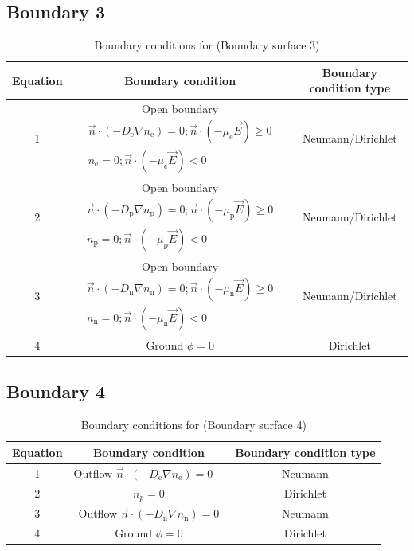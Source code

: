 \documentclass[12pt, a4paper]{report}
\begin{document}
\subsection{Boundary 3}

\begin{table}[!h]
    \centering\begin{tabular}{c|c|c}
        Equation & Boundary condition & Boundary condition type\\ \hline
        1 & Open boundary $\begin{array}{c}\vec{n} \cdot\left(-D_{\mathrm{e}} \nabla n_{\mathrm{e}}\right)=0 ; \vec{n} \cdot\left(-\mu_{\mathrm{e}} \vec{E}\right) \geqslant 0 \\ n_{\mathrm{e}}=0 ; \vec{n} \cdot\left(-\mu_{\mathrm{e}} \vec{E}\right)<0\end{array} $ & Neumann/Dirichlet \\ \hline
        2 & Open boundary $\begin{array}{c}\vec{n} \cdot\left(-D_{\mathrm{p}} \nabla n_{\mathrm{p}}\right)=0 ; \vec{n} \cdot\left(-\mu_{\mathrm{p}} \vec{E}\right) \geqslant 0 \\ n_{\mathrm{p}}=0 ; \vec{n} \cdot\left(-\mu_{\mathrm{p}} \vec{E}\right)<0\end{array} $   & Neumann/Dirichlet \\ \hline
        3 & Open boundary $\begin{array}{c}\vec{n} \cdot\left(-D_{\mathrm{n}} \nabla n_{\mathrm{n}}\right)=0 ; \vec{n} \cdot\left(-\mu_{\mathrm{n}} \vec{E}\right) \geqslant 0 \\ n_{\mathrm{n}}=0 ; \vec{n} \cdot\left(-\mu_{\mathrm{n}} \vec{E}\right)<0\end{array} $  & Neumann/Dirichlet\\ \hline
        4 & Ground $\phi=0$ & Dirichlet \\ \hline

    \end{tabular}
    \caption{Boundary conditions for  (Boundary surface 3)}
\end{table}

\subsection{Boundary 4}

\begin{table}[!h]
    \centering\begin{tabular}{c|c|c}
        Equation & Boundary condition & Boundary condition type\\ \hline
        1 & Outflow $\vec{n} \cdot\left(-D_{\mathrm{e}} \nabla n_{\mathrm{e}}\right)=0\quad$ & Neumann \\ \hline
        2 & $n_p=0$  & Dirichlet \\ \hline
        3 & Outflow $\vec{n} \cdot\left(-D_{\mathrm{n}} \nabla n_{\mathrm{n}}\right)=0$ &Neumann \\ \hline
        4 & Ground $\phi=0$ & Dirichlet \\ \hline

    \end{tabular}
    \caption{Boundary conditions for  (Boundary surface 4)}
\end{table}
\clearpage
\end{document}
